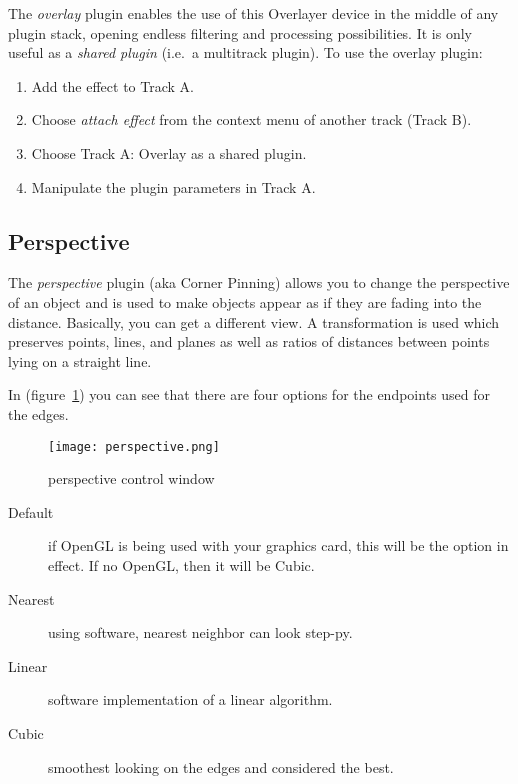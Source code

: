 The \textit{overlay} plugin enables the use of this Overlayer device in the middle of any plugin stack, opening endless filtering and processing possibilities. It is only useful as a \textit{shared plugin} (i.e.\ a multitrack plugin). To use the overlay plugin:

\begin{enumerate}
    \item Add the effect to Track A.
    \item Choose \textit{attach effect} from the context menu of another track (Track B).
    \item Choose Track A: Overlay as a shared plugin.
    \item Manipulate the plugin parameters in Track A.
\end{enumerate}

\subsection{Perspective}%
\label{sub:perspective}

The \textit{perspective} plugin (aka Corner Pinning) allows you to change the perspective of an object and is used to make objects appear as if they are fading into the distance. Basically, you can get a different view. A transformation is used which preserves points, lines, and planes as well as ratios of distances between points lying on a straight line.

In (figure~\ref{fig:perspective}) you can see that there are four options for the endpoints used for the edges.

\begin{figure}[htpb]
    \centering
    \texttt{[image: perspective.png]}
    \caption{perspective control window}
    \label{fig:perspective}
\end{figure}

\begin{description}
    \item[Default] if OpenGL is being used with your graphics card, this will be the option in effect. If no OpenGL, then it will be Cubic.
    \item[Nearest] using software, nearest neighbor can look step-py.
    \item[Linear] software implementation of a linear algorithm.
    \item[Cubic] smoothest looking on the
    edges and considered the best.
\end{description}

